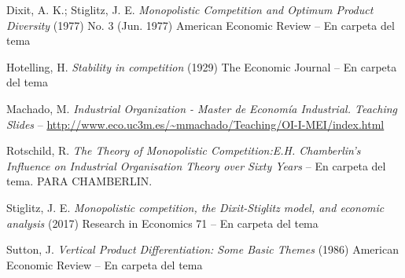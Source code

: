 \documentclass{nuevotema}
\begin{document}
Dixit, A. K.; Stiglitz, J. E. \textit{Monopolistic Competition and Optimum Product Diversity} (1977) No. 3 (Jun. 1977) American Economic Review -- En carpeta del tema

Hotelling, H. \textit{Stability in competition} (1929) The Economic Journal -- En carpeta del tema

Machado, M. \textit{Industrial Organization - Master de Economía Industrial. Teaching Slides} -- \url{http://www.eco.uc3m.es/~mmachado/Teaching/OI-I-MEI/index.html}

Rotschild, R. \textit{The Theory of Monopolistic Competition:E.H. Chamberlin's Influence on Industrial Organisation Theory over Sixty Years} -- En carpeta del tema. PARA CHAMBERLIN.

Stiglitz, J. E. \textit{Monopolistic competition, the Dixit-Stiglitz model, and economic analysis} (2017) Research in Economics 71 -- En carpeta del tema

Sutton, J. \textit{Vertical Product Differentiation: Some Basic Themes} (1986) American Economic Review -- En carpeta del tema
\end{document}
